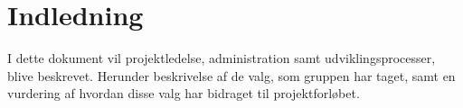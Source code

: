 \chapter{Indledning}

I dette dokument vil projektledelse, administration samt udviklingsprocesser, blive beskrevet. Herunder beskrivelse af de valg, som gruppen har taget, samt en vurdering af hvordan disse valg har bidraget til projektforløbet.